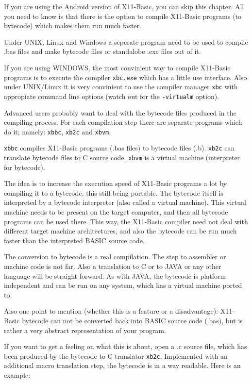 If you are using the Android version of X11-Basic, you can skip this chapter.
All you need to know is that there is the option to compile X11-Basic programs
(to bytecode) which makes them run much faster.

Under UNIX, Linux and Windows a seperate program need to be used to compile .bas files and make bytecode files or 
standalobe .exe files out of it. 

If you are using WINDOWS, the most convinient way to compile X11-Basic programs
is to execute the compiler \verb|xbc.exe| which has a little use interface. Also
under UNIX/Linux it is very convinient to use the compiler manager \verb|xbc|
with appropiate command line options (watch out for the 
\verb|-virtualm| option). 

Advanced users probably want to deal with the bytecode files produced in the
compiling process. For each compilation step there are separate programs which
do it; namely: \verb|xbbc|, \verb|xb2c| and \verb|xbvm|.

\verb|xbbc| compiles X11-Basic programs (.bas files) to bytecode files (.b).
\verb|xb2c| can translate bytecode files to C source code.
\verb|xbvm| is a virtual machine (interpreter for bytecode).

The idea is to increase the execution speed of X11-Basic programs a lot by 
compiling it to a bytecode, this still being portable. The bytecode itself is 
interpreted by a bytecode interpreter (also called a virtual machine). This
virtual machine needs to be present on the target computer, and then all
bytecode programs can be used there. This way, the X11-Basic compiler need not
deal with different target machine architectures, and also the bytecode can be
run much faster than the interpreted BASIC source code. 

The conversion to bytecode is a real compilation. The step to assembler or
machine code is not far. Also a translation to C or to JAVA or any other
language will be straight forward. As with JAVA, the bytecode is platform
independent and can be run on any system, which has a virtual machine ported to.

Also one point to mention (whether this is a feature or a disadvantage): 
X11-Basic bytecode can not be converted back into BASIC source code (.bas), but
is rather a very abstract representation of your program.

If you want to get a feeling on what this is about, open a .c source file, 
which has been produced by the bytecode to C translator \verb|xb2c|. Implemented
with an  additional macro translation step, the bytecode is in a way readable.
Here is an example:

